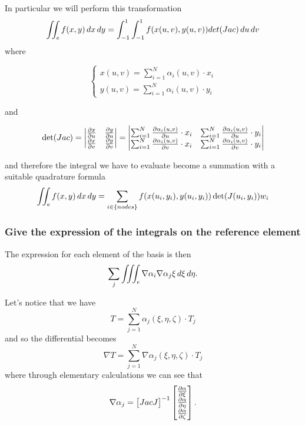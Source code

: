 \begin{mdframed}
	In particular we will perform this transformation
	\[\iint_ef(x,y)\mathop{}\!d x\mathop{}\!d y=\int_{-1}^1\int_{-1}^1f(x(u,v),y(u,v))det(Jac)\mathop{}\!d u\mathop{}\!d v \]
	where \\
	\begin{minipage}{\linewidth}
		\begin{minipage}{.325\linewidth}
			\[\begin{cases}
			x(u,v)=\sum_{i=1}^{N}\alpha_i(u,v)\cdot x_i\\
			y(u,v)=\sum_{i=1}^{N}\alpha_i(u,v)\cdot y_i
			\end{cases}\]
		\end{minipage}
		and
		\begin{minipage}{.675\linewidth}
			\[
			\det(Jac)=\begin{vmatrix}
			\frac{\partial x}{\partial u}&\frac{\partial y}{\partial u}\\
			\frac{\partial x}{\partial v}&\frac{\partial y}{\partial v}
			\end{vmatrix}
			=
			\begin{vmatrix}
			\sum_{i=1}^{N}\frac{\partial\alpha_i(u,v)}{\partial u}\cdot x_i &\sum_{i=1}^{N}\frac{\partial\alpha_i(u,v)}{\partial u}\cdot y_i\\
			\sum_{i=1}^{N}\frac{\partial\alpha_i(u,v)}{\partial v}\cdot x_i &\sum_{i=1}^{N}\frac{\partial\alpha_i(u,v)}{\partial v}\cdot y_i
			\end{vmatrix}
			\]
		\end{minipage}
	\end{minipage}
	and therefore the integral we have to evaluate become a summation with a suitable quadrature formula
	\[\iint_ef(x,y)\mathop{}\!d x\mathop{}\!d y= \sum_{i\in\{nodes\}}f(x(u_i,y_i),y(u_i,y_i))\det(J(u_i,y_i))w_i \]
\end{mdframed}
\subsubsection{Give the expression of the integrals on the reference element}
The expression for each element of the basis is then
\[\sum_j \iiint_{e}\nabla\alpha_i\nabla\alpha_j\xi\mathop{}\!d\xi\mathop{}\!d\eta. \] 

Let's notice that we have 
\[T=\sum_{j=1}^N\alpha_j(\xi,\eta,\zeta)\cdot T_j \]
and so the differential becomes
\[\nabla T=\sum_{j=1}^N\nabla\alpha_j(\xi,\eta,\zeta)\cdot T_j \]
where through elementary calculations we can see that 
\[\nabla \alpha_j=\begin{bmatrix} Jac J \end{bmatrix}^{-1}\begin{bmatrix}
\frac{\partial \alpha}{\partial \xi}\\\frac{\partial \alpha}{\partial \eta}\\\frac{\partial \alpha}{\partial \zeta} 
\end{bmatrix}. \]

